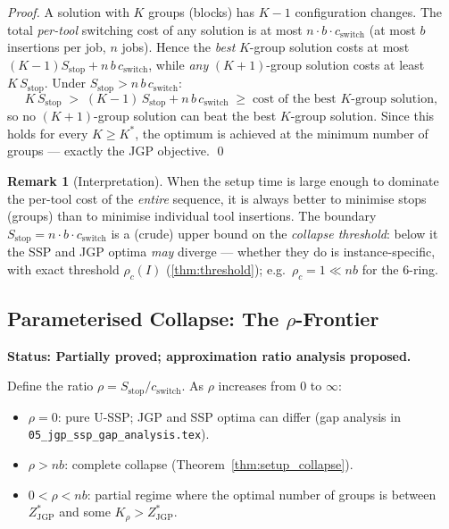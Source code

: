 \documentclass[11pt,a4paper]{article}
\theoremstyle{plain}
\theoremstyle{definition}
\newtheorem{remark}[theorem]{Remark}
\newcommand{\Kstar}{K^*}
\newcommand{\ZJGP}{Z_{\mathrm{JGP}}^*}
\begin{document}
\begin{proofbox}
\begin{proof}
A solution with $K$ groups (blocks) has $K-1$ configuration changes. The total
\emph{per-tool} switching cost of any solution is at most
$n\cdot b\cdot c_\mathrm{switch}$ (at most $b$ insertions per job, $n$ jobs). Hence the
\emph{best} $K$-group solution costs at most
$(K-1)S_\mathrm{stop}+n\,b\,c_\mathrm{switch}$, while \emph{any} $(K+1)$-group solution
costs at least $K\,S_\mathrm{stop}$. Under $S_\mathrm{stop}>n\,b\,c_\mathrm{switch}$:
\[
  K\,S_\mathrm{stop} \;>\; (K-1)\,S_\mathrm{stop}+n\,b\,c_\mathrm{switch}
  \;\ge\; \text{cost of the best } K\text{-group solution},
\]
so no $(K+1)$-group solution can beat the best $K$-group solution. Since this holds
for every $K\ge\Kstar$, the optimum is achieved at the minimum number of groups ---
exactly the JGP objective. \qed
\end{proof}
\end{proofbox}

\begin{remark}[Interpretation]
When the setup time is large enough to dominate the per-tool cost of the
\emph{entire} sequence, it is always better to minimise stops (groups) than
to minimise individual tool insertions. The boundary $S_\mathrm{stop} = n \cdot b \cdot c_\mathrm{switch}$
is a (crude) upper bound on the \emph{collapse threshold}: below it the SSP and JGP
optima \emph{may} diverge --- whether they do is instance-specific, with exact
threshold $\rho_c(I)$ (\cref{thm:threshold}); e.g.\ $\rho_c=1\ll nb$ for the $6$-ring.
\end{remark}

\subsection{Parameterised Collapse: The $\rho$-Frontier}

\begin{propbox}
\textbf{Status: Partially proved; approximation ratio analysis proposed.}
\end{propbox}

Define the ratio $\rho = S_\mathrm{stop} / c_\mathrm{switch}$.
As $\rho$ increases from 0 to $\infty$:
\begin{itemize}
\item $\rho = 0$: pure U-SSP; JGP and SSP optima can differ (gap analysis in
  \texttt{05\_jgp\_ssp\_gap\_analysis.tex}).
\item $\rho > nb$: complete collapse (Theorem~\ref{thm:setup_collapse}).
\item $0 < \rho < nb$: partial regime where the optimal number of groups
  is between $\ZJGP$ and some $K_\rho > \ZJGP$.
\end{itemize}
\end{document}
